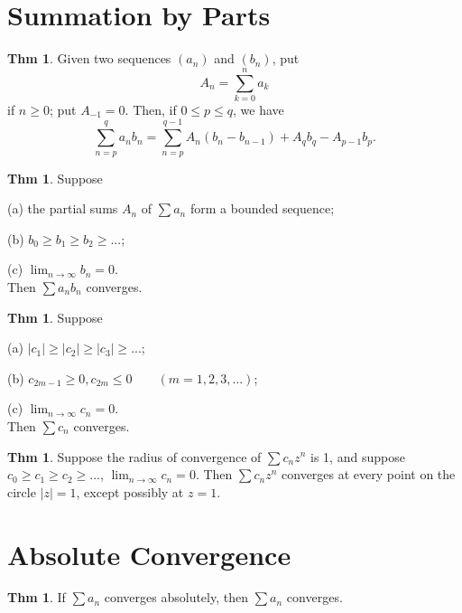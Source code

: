 \documentclass{article}
\theoremstyle{definition}
\newtheorem{theorem}[definition]{Thm}
\begin{document}
\section{Summation by Parts}
\begin{theorem}
    Given two sequences $(a_n)$ and $(b_n)$, put
    \[
    A_n=\sum_{k=0}^n a_k
    \]
    if $n\geq0$; put $A_{-1}=0$. Then, if $0\leq p\leq q$, we have
    \[
    \sum_{n=p}^{q} a_nb_n = \sum_{n=p}^{q-1} A_n(b_n-b_{n-1})+A_qb_q-A_{p-1}b_p.
    \]
\end{theorem}
\begin{theorem}
    Suppose\par
    (a) the partial sums $A_n$ of $\sum a_n$ form a bounded sequence;\par
    (b) $b_0\geq b_1\geq b_2\geq...$;\par
    (c) $\lim_{n\to\infty}b_n=0$.\\
    Then $\sum a_nb_n$ converges.
\end{theorem}
\begin{theorem}
    Suppose\par
    (a) $|c_1|\geq|c_2|\geq|c_3|\geq...$;\par
    (b) $c_{2m-1}\geq 0, c_{2m}\leq0 \qquad (m=1,2,3,...)$;\par
    (c) $\lim_{n\to\infty}c_n=0$.\\
    Then $\sum c_n$ converges.
\end{theorem}
\begin{theorem}
    Suppose the radius of convergence of $\sum c_nz^n$ is 1, and suppose $c_0\geq c_1\geq c_2\geq...$, $\lim_{n\to\infty} c_n=0$. Then $\sum c_nz^n$ converges at every point on the circle $|z|=1$, except possibly at $z=1$.
\end{theorem}

\section{Absolute Convergence}
\begin{theorem}
    If $\sum a_n$ converges absolutely, then $\sum a_n$ converges.
\end{theorem}
\end{document}
